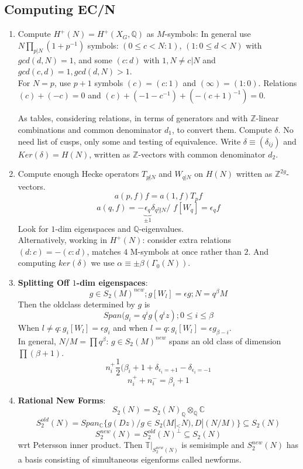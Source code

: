 \documentclass{article}
\newcommand{\Q}{\mathbb{Q}}
\newcommand{\C}{\mathbb{C}}
\newcommand{\Z}{\mathbb{Z}}
\newcommand{\T}{\mathbb{T}}
\begin{document}
\subsection{Computing EC/N}
\begin{multicols}{2}
\begin{enumerate}

\item Compute $H^+(N) = H^+(X_G,\Q)$ as $M$-symbols: 
In general use $N\prod_{p|N}(1+p^{-1})$ symbols: $(0 \leq c < N:1)$, $(1:0 \leq d < N)$ with $gcd(d,N) = 1$, and some $(c:d)$ with $1,N\neq c|N$ and $gcd(c,d)=1, gcd(d,N) > 1$. \\

For $N = p$, use $p+1$ symbols $(c) = (c:1)$ and $(\infty) = (1:0)$. Relations $(c) + (-c) = 0$ and $(c) + (-1-c^{-1}) + (-(c+1)^{-1}) = 0$.  



As tables, considering relations, in terms of generators and with $\Z$-linear combinations and common denominator $d_1$, to convert them. Compute $\delta$. No need list of cusps, only some and testing of equivalence. Write $\delta \equiv (\delta_{ij})$ and $Ker(\delta) = H(N)$, written as $\Z$-vectors with common denominator $d_2$.

\item Compute enough Hecke operators $T_{p\not|N}$ and $W_{q|N}$ on $H(N)$ written as $\Z^{2g}$-vectors. 
\[a(p,f) f = a(1,f)T_pf\]
\[a(q,f) = -\underbrace{\epsilon_q}_{\pm 1} \delta_{q^2\not|N}/\,\,f[W_q] = \epsilon_q f\] Look for $1$-dim eigenspaces and $\Q$-eigenvalues.\\

Alternatively, working in $H^+(N)$: consider extra relations $(d:c) = -(c:d)$, matches $4$ M-symbols at once rather than $2$. And computing $ker(\delta)$ we use $\alpha \equiv \pm \beta (\Gamma_0(N))$.

\item \textbf{Splitting Off $1$-dim eigenspaces}:
\[g \in S_2(M)^{new}; g[W_l] = \epsilon g; N = q^\beta M\]
Then the oldclass determined by $g$ is 
\[Span(g_i = q^ig(q^iz); 0 \leq i \leq \beta\]
When $l \neq q: g_i[W_l] = \epsilon g_i$ and when $l = q: g_i[W_l] = \epsilon g_{\beta - i}$. \\
In general, $N/M = \prod q^\beta$: $g \in S_2(M)^{new}$ spans an old class of dimension $\prod (\beta+1)$.
\[n_i^+ \frac{1}{2}(\beta_i + 1 + \delta_{\epsilon_i = +1} - \delta_{\epsilon_i = -1}\]
\[n_i^+ + n_i^- = \beta_i+1\]

\item \textbf{Rational New Forms}: 
\[S_2(N) = S_2(N)_\Q \otimes_\Q \C\]
\[S_2^{old}(N) = Span_\C\{g(Dz)/ g \in S_2(M|_{<}N), D|(N/M)\} \subseteq S_2(N)\] 
\[S_2^{new}(N) = S_2^{old}(N)^\bot \subseteq S_2(N)\] 
wrt Petersson inner product. Then $\T|_{S_2^{new}(N)}$ is semisimple and $S_2^{new}(N)$ has a basis consisting of simultaneous eigenforms called newforms.\\


\end{enumerate}
\end{multicols}
\end{document}
